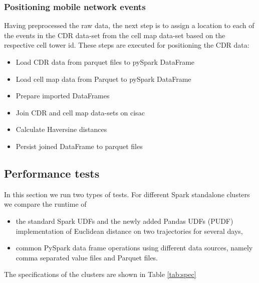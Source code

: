 \subsubsection{Positioning mobile network events}
Having preprocessed the raw data, the next step is to assign a location to each of the events in the CDR data-set from the cell map data-set based on the respective cell tower id. 
These steps are executed for positioning the CDR data:
\begin{itemize}
    \item Load CDR data from parquet files to pySpark DataFrame
    \item Load cell map data from Parquet to pySpark DataFrame
    \item Prepare imported DataFrames
    \item Join CDR and cell map data-sets on cisac
    \item Calculate Haversine distances
    \item Persist joined DataFrame to parquet files
\end{itemize}

\subsection{Performance tests}
In this section we run two types of tests. For different Spark standalone clusters we compare the runtime of
\begin{itemize}
    \item the standard Spark UDFs and the newly added Pandas UDFs (PUDF) implementation of Euclidean distance on two trajectories for several days,
    \item common PySpark data frame operations using different data sources, namely comma separated value files and Parquet files. 
\end{itemize}

The specifications of the clusters are shown in Table \ref{tab:spec}
\begin{table}[h]
    \centering
    \caption{Specifications of test clusters}
    \label{tab:spec}
\end{table}

